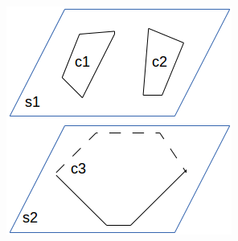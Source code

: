 \documentclass[3p,times]{elsarticle}
\begin{document}
\begin{figure}[ht]
\centering
\begin{subfigure}[b]{0.15\textwidth}
\includegraphics[width=\textwidth]{../picture/branch-contour.png}
\caption{}
\label{fig:branch-contour}
\end{subfigure}%
~%
\begin{subfigure}[b]{0.1\textwidth}

\end{subfigure}
\end{figure}
\end{document}
